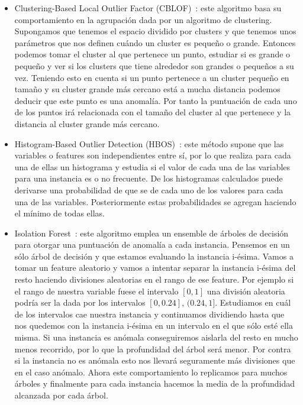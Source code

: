 \begin{itemize}
	\item Clustering-Based Local Outlier Factor (CBLOF)~\cite{he_discovering_2003}: este algoritmo basa su comportamiento en la agrupación dada por un algoritmo de clustering. Supongamos que tenemos el espacio dividido por clusters y que tenemos unos parámetros que nos definen cuándo un cluster es pequeño o grande. Entonces podemos tomar el cluster al que pertenece un punto, estudiar si es grande o pequeño y ver si los clusters que tiene alrededor son grandes o pequeños a su vez. Teniendo esto en cuenta si un punto pertenece a un cluster pequeño en tamaño y su cluster grande más cercano está a mucha distancia podemos deducir que este punto es una anomalía. Por tanto la puntuación de cada uno de los puntos irá relacionada con el tamaño del cluster al que pertenece y la distancia al cluster grande más cercano.
	\item Histogram-Based Outlier Detection (HBOS)~\cite{goldstein_histogram-based_2012}: este método supone que las variables o features son independientes entre sí, por lo que realiza para cada una de ellas un histograma y estudia si el valor de cada una de las variables para una instancia es o no frecuente. De los histogramas calculados puede derivarse una probabilidad de que se de cada uno de los valores para cada una de las variables. Posteriormente estas probabilidades se agregan haciendo el mínimo de todas ellas.
	\item Isolation Forest~\cite{liu_isolation_2008}: este algoritmo emplea un ensemble de árboles de decisión para otorgar una puntuación de anomalía a cada instancia. Pensemos en un sólo árbol de decisión y que estamos evaluando la instancia i-ésima. Vamos a tomar un feature aleatorio y vamos a intentar separar la instancia i-ésima del resto haciendo divisiones aleatorias en el rango de ese feature. Por ejemplo si el rango de nuestra variable fuese el intervalo $[0,1]$ una división aleatoria podría ser la dada por los intervalos $[0,0.24]$, $(0.24,1]$. Estudiamos en cuál de los intervalos cae nuestra instancia y continuamos dividiendo hasta que nos quedemos con la instancia i-ésima en un intervalo en el que sólo esté ella misma. Si una instancia es anómala conseguiremos aislarla del resto en mucho menos recorrido, por lo que la profundidad del árbol será menor. Por contra si la instancia no es anómala esto nos llevará seguramente más divisiones que en el caso anómalo. Ahora este comportamiento lo replicamos para muchos árboles y finalmente para cada instancia hacemos la media de la profundidad alcanzada por cada árbol.

\end{itemize}
